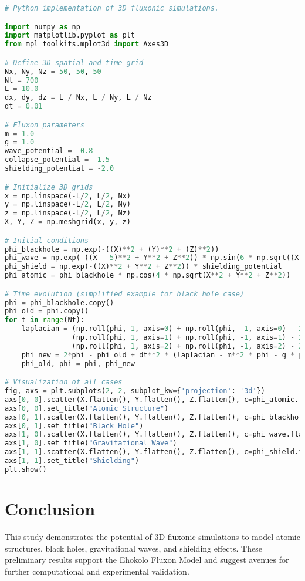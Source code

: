 \documentclass{article}
\begin{document}
\begin{lstlisting}[language=Python, caption=3D Fluxonic Simulations, label=lst:simulation]
# Python implementation of 3D fluxonic simulations.

import numpy as np
import matplotlib.pyplot as plt
from mpl_toolkits.mplot3d import Axes3D

# Define 3D spatial and time grid
Nx, Ny, Nz = 50, 50, 50
Nt = 700
L = 10.0
dx, dy, dz = L / Nx, L / Ny, L / Nz
dt = 0.01

# Fluxon parameters
m = 1.0
g = 1.0
wave_potential = -0.8
collapse_potential = -1.5
shielding_potential = -2.0

# Initialize 3D grids
x = np.linspace(-L/2, L/2, Nx)
y = np.linspace(-L/2, L/2, Ny)
z = np.linspace(-L/2, L/2, Nz)
X, Y, Z = np.meshgrid(x, y, z)

# Initial conditions
phi_blackhole = np.exp(-((X)**2 + (Y)**2 + (Z)**2))
phi_wave = np.exp(-((X - 5)**2 + Y**2 + Z**2)) * np.sin(6 * np.sqrt((X - 5)**2 + Y**2 + Z**2))
phi_shield = np.exp(-((X)**2 + Y**2 + Z**2)) * shielding_potential
phi_atomic = phi_blackhole * np.cos(4 * np.sqrt(X**2 + Y**2 + Z**2))

# Time evolution (simplified example for black hole case)
phi = phi_blackhole.copy()
phi_old = phi.copy()
for t in range(Nt):
    laplacian = (np.roll(phi, 1, axis=0) + np.roll(phi, -1, axis=0) - 2*phi)/dx**2 + \
                (np.roll(phi, 1, axis=1) + np.roll(phi, -1, axis=1) - 2*phi)/dy**2 + \
                (np.roll(phi, 1, axis=2) + np.roll(phi, -1, axis=2) - 2*phi)/dz**2
    phi_new = 2*phi - phi_old + dt**2 * (laplacian - m**2 * phi - g * phi**3 + collapse_potential)
    phi_old, phi = phi, phi_new

# Visualization of all cases
fig, axs = plt.subplots(2, 2, subplot_kw={'projection': '3d'})
axs[0, 0].scatter(X.flatten(), Y.flatten(), Z.flatten(), c=phi_atomic.flatten(), cmap="inferno")
axs[0, 0].set_title("Atomic Structure")
axs[0, 1].scatter(X.flatten(), Y.flatten(), Z.flatten(), c=phi_blackhole.flatten(), cmap="inferno")
axs[0, 1].set_title("Black Hole")
axs[1, 0].scatter(X.flatten(), Y.flatten(), Z.flatten(), c=phi_wave.flatten(), cmap="inferno")
axs[1, 0].set_title("Gravitational Wave")
axs[1, 1].scatter(X.flatten(), Y.flatten(), Z.flatten(), c=phi_shield.flatten(), cmap="inferno")
axs[1, 1].set_title("Shielding")
plt.show()
\end{lstlisting}

\section{Conclusion}
This study demonstrates the potential of 3D fluxonic simulations to model atomic structures, black holes, gravitational waves, and shielding effects. These preliminary results support the Ehokolo Fluxon Model and suggest avenues for further computational and experimental validation.
\end{document}
